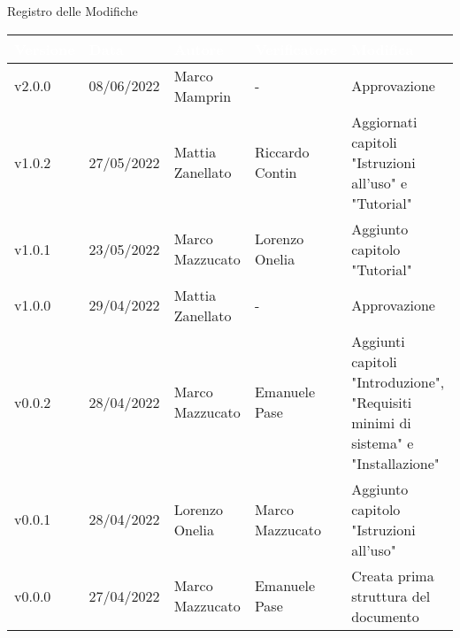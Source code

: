 \begin{center}
  \huge{Registro delle Modifiche}
\end{center}
\renewcommand\arraystretch{1,5}
{\centering
\begin{longtable}{|C{1.8cm}|C{2.1cm}|C{2cm}|C{2.4cm}|L{4.4cm}|}
  \hline
  \textcolor[HTML]{FFFFFF}{\textbf{Versione}} & \textcolor[HTML]{FFFFFF}{\textbf{Data}} & \textcolor[HTML]{FFFFFF}{\textbf{Autore}}  & \textcolor[HTML]{FFFFFF}{\textbf{Verificatore}} & \textcolor[HTML]{FFFFFF}{\textbf{Modifica}}    \\ \hline
  v2.0.0        & 08/06/2022    & Marco Mamprin    & -    & Approvazione  \\ \hline
  v1.0.2      & 27/05/2022    & Mattia Zanellato   &  Riccardo Contin    & Aggiornati capitoli "Istruzioni all'uso" e "Tutorial"   \\ \hline
  v1.0.1      & 23/05/2022    & Marco Mazzucato   &  Lorenzo Onelia      & Aggiunto capitolo "Tutorial"  \\ \hline
  v1.0.0        & 29/04/2022    & Mattia Zanellato    & -    & Approvazione  \\ \hline
  v0.0.2      & 28/04/2022    & Marco Mazzucato   & Emanuele Pase       & Aggiunti capitoli "Introduzione", "Requisiti minimi di sistema" e "Installazione"\\ \hline
  v0.0.1        & 28/04/2022    & Lorenzo Onelia    & Marco Mazzucato       & Aggiunto capitolo "Istruzioni all'uso" \\ \hline
  v0.0.0        & 27/04/2022    & Marco Mazzucato   &  Emanuele Pase     & Creata prima struttura del documento \\ \hline
\end{longtable}}

\renewcommand\arraystretch{1}
